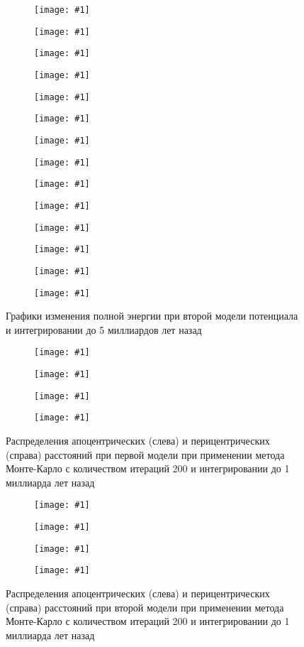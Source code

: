 \documentclass[a4paper, oneside]{article}
\newlength{\imagewidth}
\newlength{\imageheight}
\newcommand{\subgraphics}[1]{
\settowidth{\imagewidth}{\texttt{[image: \#1]}}%
\begin{subfigure}{\imagewidth}%
    \texttt{[image: \#1]}%
\end{subfigure}%
}
\begin{document}
\newpage

\begin{figure}[H]
  \setlength{\imageheight}{3.85cm}
  \centering
  \subgraphics{orbits/M2/E 1/E 1 (Total energy)}
  \subgraphics{orbits/M2/FSR 1716/FSR 1716 (Total energy)}
  \subgraphics{orbits/M2/NGC 104/NGC 104 (Total energy)}
  \subgraphics{orbits/M2/NGC 1851/NGC 1851 (Total energy)}
  \subgraphics{orbits/M2/NGC 2419/NGC 2419 (Total energy)}
  \subgraphics{orbits/M2/NGC 5927/NGC 5927 (Total energy)}
  \subgraphics{orbits/M2/NGC 6284/NGC 6284 (Total energy)}
  \subgraphics{orbits/M2/NGC 7078/NGC 7078 (Total energy)}
  \subgraphics{orbits/M2/Pal 1/Pal 1 (Total energy)}
  \subgraphics{orbits/M2/Pal 3/Pal 3 (Total energy)}
  \subgraphics{orbits/M2/Pal 4/Pal 4 (Total energy)}
  \subgraphics{orbits/M2/Pal 7/Pal 7 (Total energy)}
  \subgraphics{orbits/M2/Pyxis/Pyxis (Total energy)}
  \subgraphics{orbits/M2/Whiting 1/Whiting 1 (Total energy)}
  \caption{Графики изменения полной энергии при второй модели потенциала и интегрировании до 5 миллиардов лет назад}
\end{figure}

\newpage

\begin{figure}[h!]
  \centering
  \setlength{\imageheight}{3.85cm}
  \subgraphics{simulations/M1/NGC 5927/NGC 5927 (Apocentric distances)}
  \subgraphics{simulations/M1/NGC 5927/NGC 5927 (Pericentric distances)}
  \subgraphics{simulations/M1/Pyxis/Pyxis (Apocentric distances)}
  \subgraphics{simulations/M1/Pyxis/Pyxis (Pericentric distances)}
  \caption{Распределения апоцентрических (слева) и перицентрических (справа) расстояний при первой модели при применении метода Монте-Карло с количеством итераций 200 и интегрировании до 1 миллиарда лет назад}
\end{figure}

\begin{figure}[h!]
  \centering
  \setlength{\imageheight}{3.85cm}
  \subgraphics{simulations/M2/NGC 5927/NGC 5927 (Apocentric distances)}
  \subgraphics{simulations/M2/NGC 5927/NGC 5927 (Pericentric distances)}
  \subgraphics{simulations/M2/Pyxis/Pyxis (Apocentric distances)}
  \subgraphics{simulations/M2/Pyxis/Pyxis (Pericentric distances)}
  \caption{Распределения апоцентрических (слева) и перицентрических (справа) расстояний при второй модели при применении метода Монте-Карло с количеством итераций 200 и интегрировании до 1 миллиарда лет назад}
\end{figure}

\newpage
\end{document}
